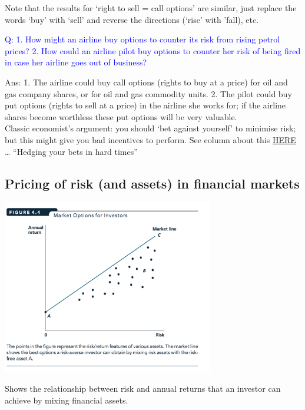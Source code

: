 \documentclass[]{article}
\providecommand{\tightlist}{%
  \setlength{\itemsep}{0pt}\setlength{\parskip}{0pt}}
\begin{document}
Note that the results for `right to sell = call options' are similar, just replace the words `buy' with `sell' and reverse the directions (`rise' with 'fall), etc.

\textcolor{blue}{Q: 1. How might an airline buy options to counter its risk from rising petrol prices? 2. How could an airline pilot buy options to counter her risk of being fired in case her airline goes out of business?}

Ans: 1. The airline could buy call options (rights to buy at a price) for oil and gas company shares, or for oil and gas commodity units. 2. The pilot could buy put options (rights to sell at a price) in the airline she works for; if the airline shares become worthless these put options will be very valuable.\\
Classic economist's argument: you should `bet against yourself' to minimise risk; but this might give you bad incentives to perform. See column about this \href{http://www.marketplace.org/2008/08/11/business/hedging-your-bets-hard-times}{HERE} \ldots{} ``Hedging your bets in hard times''

\hypertarget{pricing-of-risk-and-assets-in-financial-markets}{%
\subsection{Pricing of risk (and assets) in financial markets}\label{pricing-of-risk-and-assets-in-financial-markets}}

\includegraphics[height=3in]{picsfigs/marketriskline.png}

\begin{description}
\tightlist
\item[Market line]
Shows the relationship between risk and annual returns that an investor can achieve by mixing financial assets.
\end{description}
\end{document}
